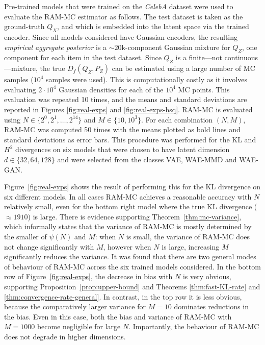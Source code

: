 Pre-trained models that were trained on the \emph{CelebA} dataset \citep{liu2015faceattributes} were used to evaluate the RAM-MC estimator as follows.
The test dataset is taken as the ground-truth $Q_X$, and which is embedded into the latent space via the trained encoder.
Since all models considered have Gaussian encoders, the resulting \emph{empirical aggregate posterior}
is a ${\sim}{20}\text{k}$-component Gaussian mixture for $Q_Z$, one component for each item in the test dataset. 
Since $Q_Z$ is a finite---not continuous---mixture, the true $D_f(Q_Z,P_Z)$ can be estimated using a large number of MC samples ($10^4$ samples were used).
This is computationally costly as it involves evaluating $2\cdot 10^4$ Gaussian densities for each of the $10^4$ MC points.
This evaluation was repeated 10 times, and the means and standard deviations are reported in Figures \ref{fig:real-exps} and \ref{fig:real-exps-hsq}.
RAM-MC is evaluated using $N \in \{2^0, 2^1,\ldots, 2^{14}\}$ and $M \in \{10, 10^3\}$.
For each combination $(N,M)$, RAM-MC was computed 50 times with the means plotted as bold lines and standard deviations as error bars.
This procedure was performed for the KL and $H^2$ divergences on six models that were chosen to have latent dimension $d\in\{32, 64, 128\}$ and were selected from the classes VAE, WAE-MMD and WAE-GAN.


Figure~\ref{fig:real-exps} shows the result of performing this for the KL divergence on six different models.
In all cases RAM-MC achieves a reasonable accuracy with $N$ relatively small, even for the bottom right model where the true KL divergence ($\approx 1910$) is large.
There is evidence supporting Theorem~\ref{thm:mc-variance}, which informally states that the variance of RAM-MC is mostly determined by the smaller of $\psi(N)$ and $M$:
when $N$ is small, the variance of RAM-MC does not change significantly with $M$, 
however when $N$ is large, increasing $M$ significantly reduces the variance. 
It was found that there are two general modes of behaviour of RAM-MC across the six trained models considered. 
In the bottom row of Figure~\ref{fig:real-exps}, the decrease in bias with $N$ is very obvious, supporting Proposition~\ref{prop:upper-bound} and Theorems \ref{thm:fast-KL-rate} and \ref{thm:convergence-rate-general}.
In contrast, in the top row it is less obvious, because the comparatively larger variance for $M{=}10$ dominates reductions in the bias.
Even in this case, both the bias and variance of RAM-MC with $M{=}1000$ become negligible for large $N$.
Importantly, the behaviour of RAM-MC does not degrade in higher dimensions.

